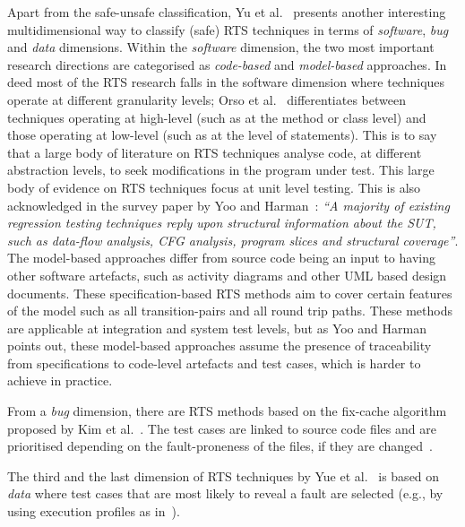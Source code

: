 \documentclass[11pt, oneside]{article}   	%
\begin{document}
Apart from the safe-unsafe classification, Yu et al.~\cite{Yu12} presents another interesting multidimensional way to classify (safe) RTS techniques in terms of \textit{software}, \textit{bug} and \textit{data} dimensions. Within the \textit{software} dimension, the two most important research directions are categorised as \textit{code-based} and \textit{model-based} approaches. In deed most of the RTS research falls in the software dimension where techniques operate at different granularity levels; Orso et al.~\cite{Orso04} differentiates between techniques operating at high-level (such as at the method or class level) and those operating at low-level (such as at the level of statements). This is to say that a large body of literature on RTS techniques analyse code, at different abstraction levels, to seek modifications in the program under test. This large body of evidence on RTS techniques focus at unit level testing. This is also acknowledged in the survey paper by Yoo and Harman~\cite{Yoo12}: \textit{``A majority of existing regression testing techniques reply upon structural information about the SUT, such as data-flow analysis, CFG analysis, program slices and structural coverage''}. The model-based approaches differ from source code being an input to having other software artefacts, such as activity diagrams and other UML based design documents. These specification-based RTS methods aim to cover certain features of the model such as all transition-pairs and all round trip paths. These methods are applicable at integration and system test levels, but as Yoo and Harman~\cite{Yoo12} points out, these model-based approaches assume the presence of traceability from specifications to code-level artefacts and test cases, which is harder to achieve in practice.  

From a \textit{bug} dimension, there are RTS methods based on the fix-cache algorithm proposed by Kim et al.~\cite{Kim07}. The test cases are linked to source code files and are prioritised depending on the fault-proneness of the files, if they are changed~\cite{Engstrom10b,Wikstrand09}. 

The third and the last dimension of RTS  techniques by Yue et al.~\cite{Yu12} is based on \textit{data} where test cases that are most likely to reveal a fault are selected (e.g., by using execution profiles as in~\cite{Zhang10}). 
\end{document}
